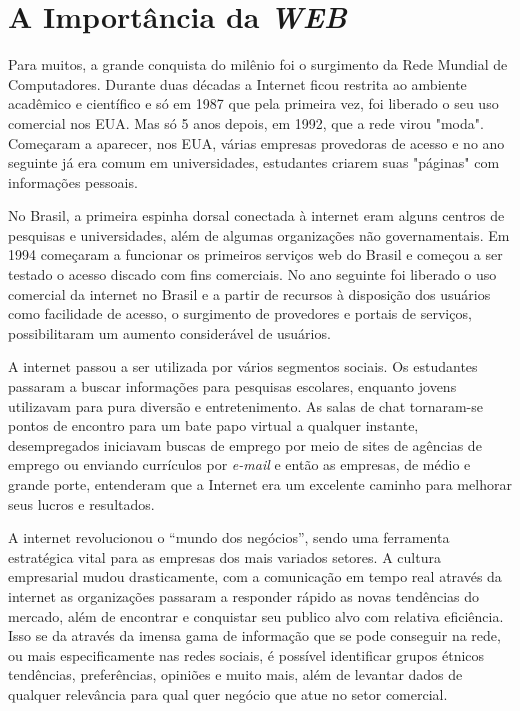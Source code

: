 \section{A Importância da \textit{WEB}}

Para muitos, a grande conquista do milênio foi o surgimento da Rede Mundial de
Computadores. Durante duas décadas a Internet ficou restrita ao ambiente acadêmico e científico e
só em 1987 que pela primeira vez, foi liberado o seu uso comercial nos EUA. Mas só 5 anos depois,
em 1992, que a rede virou "moda". Começaram a aparecer, nos EUA, várias empresas provedoras
de acesso e no ano seguinte já era comum em universidades, estudantes criarem suas "páginas" com
informações pessoais.

No Brasil, a primeira espinha dorsal conectada à internet eram alguns centros de pesquisas
e universidades, além de algumas organizações não governamentais. Em 1994 começaram a
funcionar os primeiros serviços web do Brasil e começou a ser testado o acesso discado com fins
comerciais. No ano seguinte foi liberado o uso comercial da internet no Brasil e a partir de recursos
à disposição dos usuários como facilidade de acesso, o surgimento de provedores e portais de
serviços, possibilitaram um aumento considerável de usuários.

A internet passou a ser utilizada por vários segmentos sociais. Os estudantes passaram a
buscar informações para pesquisas escolares, enquanto jovens utilizavam para pura diversão e
entretenimento. As salas de chat tornaram-se pontos de encontro para um bate papo virtual a
qualquer instante, desempregados iniciavam buscas de emprego por meio de sites de agências de
emprego ou enviando currículos por \textit{e-mail} e então as empresas, de médio e grande porte,
entenderam que a Internet era um excelente caminho para melhorar seus lucros e resultados.

A internet revolucionou o “mundo dos negócios”, sendo uma ferramenta estratégica vital
para as empresas dos mais variados setores. A cultura empresarial mudou drasticamente, com a
comunicação em tempo real através da internet as organizações passaram a responder rápido as
novas tendências do mercado, além de encontrar e conquistar seu publico alvo com relativa
eficiência. Isso se da através da imensa gama de informação que se pode conseguir na rede, ou mais
especificamente nas redes sociais, é possível identificar grupos étnicos tendências, preferências,
opiniões e muito mais, além de levantar dados de qualquer relevância para qual quer negócio que
atue no setor comercial. \cite{evolucao}

